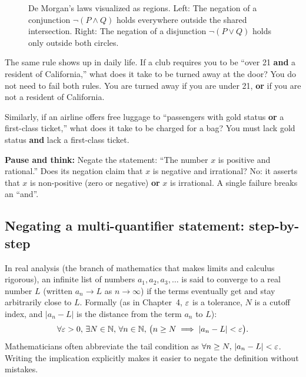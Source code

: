 \begin{figure}[htbp]
\caption{De Morgan's laws visualized as regions. Left: The negation of a conjunction $\neg(P \land Q)$ holds everywhere outside the shared intersection. Right: The negation of a disjunction $\neg(P \lor Q)$ holds only outside both circles.}
\label{05:fig-demorgan}
\end{figure}

The same rule shows up in daily life. If a club requires you to be ``over 21 \textbf{and} a resident of California,'' what does it take to be turned away at the door? You do not need to fail both rules. You are turned away if you are under 21, \textbf{or} if you are not a resident of California.

Similarly, if an airline offers free luggage to ``passengers with gold status \textbf{or} a first-class ticket,'' what does it take to be charged for a bag? You must lack gold status \textbf{and} lack a first-class ticket.

\begin{recoverybox}
\textbf{Pause and think:} Negate the statement: ``The number $x$ is positive and rational.'' Does its negation claim that $x$ is negative and irrational? No: it asserts that $x$ is non-positive (zero or negative) \textbf{or} $x$ is irrational. A single failure breaks an ``and''.
\end{recoverybox}

\subsection{Negating a multi-quantifier statement: step-by-step}

In real analysis (the branch of mathematics that makes limits and calculus rigorous), an infinite list of numbers $a_1, a_2, a_3, \ldots$ is said to converge to a real number $L$ (written $a_n \to L$ as $n \to \infty$) if the terms eventually get and stay arbitrarily close to $L$. Formally (as in Chapter~4, $\varepsilon$ is a tolerance, $N$ is a cutoff index, and $|a_n - L|$ is the distance from the term $a_n$ to $L$):
\[
\forall \varepsilon > 0, \, \exists N \in \mathbb{N}, \, \forall n \in \mathbb{N}, \, \bigl(n \ge N \implies |a_n - L| < \varepsilon\bigr).
\]
Mathematicians often abbreviate the tail condition as $\forall n \ge N, \, |a_n - L| < \varepsilon$. Writing the implication explicitly makes it easier to negate the definition without mistakes.

